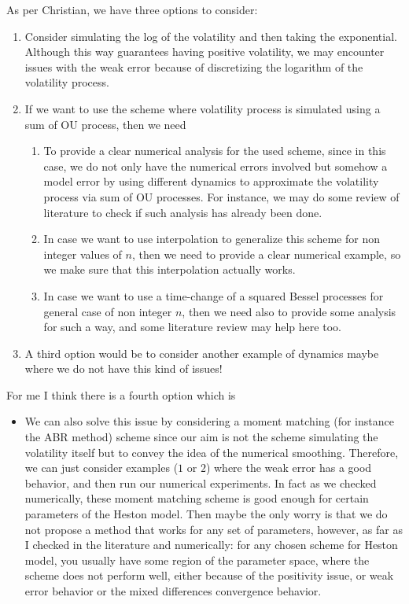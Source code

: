 \documentclass[11pt]{article}
\begin{document}
As per Christian, we have three options to consider:
\begin{enumerate}
\item Consider simulating the log of the volatility and then taking the exponential. Although this way guarantees having positive volatility,  we may encounter issues with the weak error because of discretizing the logarithm of the volatility process.
\item If we want to use the scheme where volatility process is simulated using a sum of OU process, then we need 
\begin{enumerate}
\item To provide a clear numerical analysis for the used scheme, since in this case, we do not only have the numerical errors involved but somehow a model error by using different dynamics to approximate the volatility process via sum of OU processes. For instance, we may do some review of literature to check if such analysis has already been done.
\item In case we want to  use interpolation to generalize this scheme for non integer values of $n$, then we need to provide a clear numerical example, so we make sure that this interpolation actually works.
\item In case we want to use a time-change of a squared Bessel processes for general case of non integer $n$, then we need also to provide some analysis for such a way, and some literature review may help here too.
\end{enumerate} 
\item A third option would be to consider another example of dynamics maybe where we do not have this kind of issues!
\end{enumerate}

For me I think there is a fourth option which is 
\begin{itemize}
\item We can also  solve this issue by considering a moment matching (for instance the ABR method) scheme since our aim is not the scheme simulating the volatility itself but to convey the idea of the numerical smoothing. Therefore, we can just consider examples ($1$ or $2$) where the weak error has a good behavior, and then run our numerical experiments. In fact as we checked numerically, these moment matching scheme is good enough for certain parameters of the Heston model. Then maybe the only worry is that we do not propose a method that works for any set of parameters, however, as far as I checked in the literature and numerically: for any chosen scheme for Heston model, you usually  have some region of the parameter space, where the scheme does not perform well, either because of the positivity issue, or weak error behavior or the mixed differences convergence behavior. 
\end{itemize}
\end{document}

